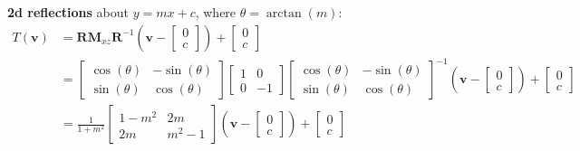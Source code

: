 \documentclass{article}
\begin{document}
\begin{minipage}[t]{126.1962963mm}
    \textbf{2d reflections} about \(y=mx + c\), where \(\theta=\arctan{\left( m \right)}\):
    \begin{align*}
        T\left( \symbf{v} \right) & = \symbf{R} \symbf{M}_{xz} \symbf{R}^{-1} \left( \symbf{v} - \begin{bmatrix} 0 \\ c \end{bmatrix} \right) + \begin{bmatrix} 0 \\ c \end{bmatrix} \\
                                    & =
        \begin{bmatrix}
            \cos{\left( \theta \right)} & -\sin{\left( \theta \right)} \\
            \sin{\left( \theta \right)} & \cos{\left( \theta \right)}
        \end{bmatrix}
        \begin{bmatrix}
            1 & 0  \\
            0 & -1
        \end{bmatrix}
        \begin{bmatrix}
            \cos{\left( \theta \right)} & -\sin{\left( \theta \right)} \\
            \sin{\left( \theta \right)} & \cos{\left( \theta \right)}
        \end{bmatrix}^{-1} \left( \symbf{v} - \begin{bmatrix} 0 \\ c \end{bmatrix} \right) +
        \begin{bmatrix} 0 \\ c \end{bmatrix}                                                                                                                                               \\
                                    & = \frac{1}{1+m^2}
        \begin{bmatrix}
            1-m^2 & 2m    \\
            2m    & m^2-1
        \end{bmatrix} \left( \symbf{v} - \begin{bmatrix} 0 \\ c \end{bmatrix} \right) +
        \begin{bmatrix} 0 \\ c \end{bmatrix}                                                                                                                                               \\
    \end{align*}
    \begin{multicols*}{2}

\end{multicols*}
\end{minipage}
\end{document}
